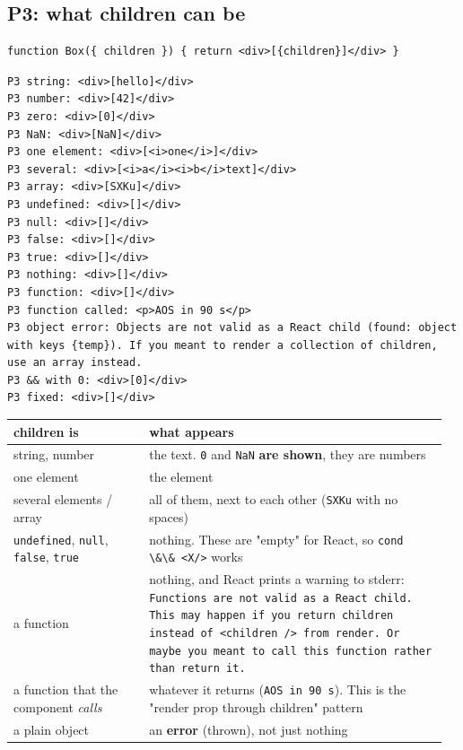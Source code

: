 \hypertarget{p3-what-children-can-be}{%
\subsection{P3: what children can be}\label{p3-what-children-can-be}}

\begin{lstlisting}
function Box({ children }) { return <div>[{children}]</div> }
\end{lstlisting}

\begin{lstlisting}
P3 string: <div>[hello]</div>
P3 number: <div>[42]</div>
P3 zero: <div>[0]</div>
P3 NaN: <div>[NaN]</div>
P3 one element: <div>[<i>one</i>]</div>
P3 several: <div>[<i>a</i><i>b</i>text]</div>
P3 array: <div>[SXKu]</div>
P3 undefined: <div>[]</div>
P3 null: <div>[]</div>
P3 false: <div>[]</div>
P3 true: <div>[]</div>
P3 nothing: <div>[]</div>
P3 function: <div>[]</div>
P3 function called: <p>AOS in 90 s</p>
P3 object error: Objects are not valid as a React child (found: object with keys {temp}). If you meant to render a collection of children, use an array instead.
P3 && with 0: <div>[0]</div>
P3 fixed: <div>[]</div>
\end{lstlisting}

{\small\begin{longtable}[]{@{}>{\raggedright\arraybackslash}p{0.30\linewidth}>{\raggedright\arraybackslash}p{0.66\linewidth}@{}}
\toprule\noalign{}
children is & what appears \\
\midrule\noalign{}
\endhead
\bottomrule\noalign{}
\endlastfoot
string, number & the text. \passthrough{\lstinline!0!} and \passthrough{\lstinline!NaN!} \textbf{are shown}, they are numbers \\
one element & the element \\
several elements / array & all of them, next to each other (\passthrough{\lstinline!SXKu!} with no spaces) \\
\passthrough{\lstinline!undefined!}, \passthrough{\lstinline!null!}, \passthrough{\lstinline!false!}, \passthrough{\lstinline!true!} & nothing. These are "empty" for React, so \passthrough{\lstinline!cond \&\& <X/>!} works \\
a function & nothing, and React prints a warning to stderr: \passthrough{\lstinline!Functions are not valid as a React child. This may happen if you return children instead of <children /> from render. Or maybe you meant to call this function rather than return it.!} \\
a function that the component \emph{calls} & whatever it returns (\passthrough{\lstinline!AOS in 90 s!}). This is the "render prop through children" pattern \\
a plain object & an \textbf{error} (thrown), not just nothing \\
\end{longtable}}

